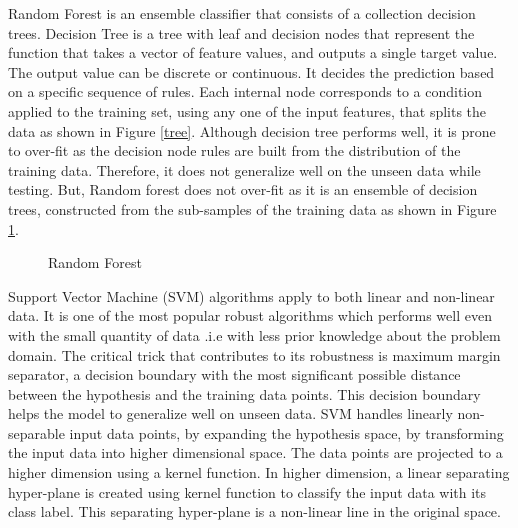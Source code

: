 \documentclass[12pt]{report} %
\begin{document}
Random Forest is an ensemble classifier that consists of a collection decision trees. Decision Tree is a tree with leaf and decision nodes that represent the function that takes a vector of feature values, and outputs a single target value. The output value can be discrete or continuous. It decides the prediction based on a specific sequence of rules. Each internal node corresponds to a condition applied to the training set, using any one of the input features, that splits the data as shown in Figure \ref{tree}. Although decision tree performs well, it is prone to over-fit as the decision node rules are built from the distribution of the training data. Therefore, it does not generalize well on the unseen data while testing. But, Random forest does not over-fit as it is an ensemble of decision trees, constructed from the sub-samples of the training data as shown in Figure \ref{rf}. 

\begin{figure}[!tbp]
	\centering
	\caption{Random Forest}
	\label{rf}
\end{figure}

Support Vector Machine (SVM) algorithms apply to both linear and non-linear data. It is one of the most popular robust algorithms which performs well even with the small quantity of data .i.e with less prior knowledge about the problem domain. The critical trick that contributes to its robustness is maximum margin separator, a decision boundary with the most significant possible distance between the hypothesis and the training data points. This decision boundary helps the model to generalize well on unseen data. SVM handles linearly non-separable input data points, by expanding the hypothesis space, by transforming the input data into higher dimensional space. The data points are projected to a higher dimension using a kernel function. In higher dimension, a linear separating hyper-plane is created using kernel function to classify the input data with its class label. This separating hyper-plane is a non-linear line in the original space. 
\end{document}
